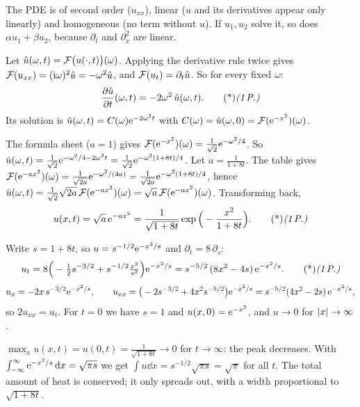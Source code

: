 \begin{solution}
 The PDE is of second order ($u_{xx}$), linear ($u$ and its derivatives appear only linearly) and homogeneous (no term without $u$). 
If $u_1,u_2$ solve it, so does $\alpha u_1+\beta u_2$, because $\partial_t$ and $\partial_x^2$ are linear. 

 Let $\hat u(\omega,t)=\mathcal{F}\big(u(\cdot,t)\big)(\omega)$. Applying the derivative rule twice gives $\mathcal{F}(u_{xx})=(\mathrm{i}\omega)^2\hat u=-\omega^2\hat u$, and $\mathcal{F}(u_t)=\partial_t\hat u$. 
So for every fixed $\omega$:
\[
\frac{\partial\hat u}{\partial t}(\omega,t)=-2\omega^2\,\hat u(\omega,t).\ptd{1}
\]
Its solution is $\hat u(\omega,t)=C(\omega)\mathrm{e}^{-2\omega^2t}$ with $C(\omega)=\hat u(\omega,0)=\mathcal{F}(\mathrm{e}^{-x^2})(\omega)$. 

 The formula sheet ($a=1$) gives $\mathcal{F}(\mathrm{e}^{-x^2})(\omega)=\frac1{\sqrt2}\mathrm{e}^{-\omega^2/4}$. 
So $\hat u(\omega,t)=\frac1{\sqrt2}\mathrm{e}^{-\omega^2/4-2\omega^2t}=\frac1{\sqrt2}\mathrm{e}^{-\omega^2(1+8t)/4}$. 
Let $a=\frac1{1+8t}$. The table gives $\mathcal{F}(\mathrm{e}^{-ax^2})(\omega)=\frac1{\sqrt{2a}}\mathrm{e}^{-\omega^2/(4a)}=\frac1{\sqrt{2a}}\mathrm{e}^{-\omega^2(1+8t)/4}$, hence
$\hat u(\omega,t)=\frac1{\sqrt2}\sqrt{2a}\,\mathcal{F}(\mathrm{e}^{-ax^2})(\omega)=\sqrt a\,\mathcal{F}(\mathrm{e}^{-ax^2})(\omega)$. 
Transforming back,
\[
u(x,t)=\sqrt a\,\e^{-ax^2}=\frac1{\sqrt{1+8t}}\exp\Big(-\frac{x^2}{1+8t}\Big).\ptd{1}
\]

 Write $s=1+8t$, so $u=s^{-1/2}\mathrm{e}^{-x^2/s}$ and $\partial_t=8\,\partial_s$:
\[
u_t=8\Big(-\tfrac12s^{-3/2}+s^{-1/2}\tfrac{x^2}{s^2}\Big)\e^{-x^2/s}=s^{-5/2}\,(8x^2-4s)\,\e^{-x^2/s}.\ptd{1}
\]
\[
u_x=-2x\,s^{-3/2}\mathrm{e}^{-x^2/s},\qquad u_{xx}=\big(-2s^{-3/2}+4x^2s^{-5/2}\big)\mathrm{e}^{-x^2/s}=s^{-5/2}(4x^2-2s)\,\mathrm{e}^{-x^2/s},
\]
so $2u_{xx}=u_t$. 
For $t=0$ we have $s=1$ and $u(x,0)=\mathrm{e}^{-x^2}$, and $u\to0$ for $\lvert x\rvert\to\infty$. 

 $\max_xu(x,t)=u(0,t)=\frac1{\sqrt{1+8t}}\to0$ for $t\to\infty$: the peak decreases. 
With $\int_{-\infty}^\infty\mathrm{e}^{-x^2/s}\,\mathrm{d} x=\sqrt{\pi s}$ we get $\int u\dd x=s^{-1/2}\sqrt{\pi s}=\sqrt\pi$ for all $t$. The total amount of heat is conserved; it only spreads out, with a width proportional to $\sqrt{1+8t}$. 


\end{solution}
